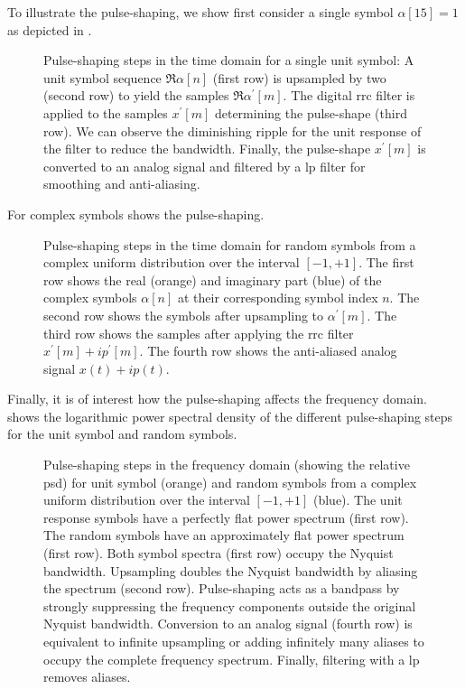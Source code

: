 To illustrate the pulse-shaping, we show first consider a single symbol $\alpha[15]=1$ as depicted in .
\begin{figure}[htb]
	\centering
	
	\caption{Pulse-shaping steps in the time domain for a single unit symbol: A unit symbol sequence $\Re\alpha[n]$ (first row) is upsampled by two (second row) to yield the samples $\Re\alpha^\prime[m]$. The digital \gls{rrc} filter is applied to the samples $x^\prime[m]$ determining the pulse-shape (third row). We can observe the diminishing ripple for the unit response of the filter to reduce the bandwidth. Finally, the pulse-shape $x^\prime[m]$ is converted to an analog signal and filtered by a \gls{lp} filter for smoothing and anti-aliasing.}\label{fig:pulse_shaping_unit_time}
\end{figure}
For complex symbols  shows the pulse-shaping.
\begin{figure}[htb]
	\centering
	
	\caption{Pulse-shaping steps in the time domain for random symbols from a complex uniform distribution over the interval $[-1,+1]$. The first row shows the real (orange) and imaginary part (blue) of the complex symbols $\alpha[n]$ at their corresponding symbol index $n$. The second row shows the symbols after upsampling to $\alpha^\prime[m]$. The third row shows the samples after applying the \gls{rrc} filter $x^\prime[m]+ip^\prime[m]$. The fourth row shows the anti-aliased analog signal $x(t)+ip(t)$.}\label{fig:pulse_shaping_rand_time}
\end{figure}
Finally, it is of interest how the pulse-shaping affects the frequency domain.
 shows the logarithmic power spectral density of the different pulse-shaping steps for the unit symbol and random symbols.
\begin{figure}[htb]
	\centering
	
	\caption{Pulse-shaping steps in the frequency domain (showing the relative \gls{psd}) for unit symbol (orange) and random symbols from a complex uniform distribution over the interval $[-1,+1]$ (blue). The unit response symbols have a perfectly flat power spectrum (first row). The random symbols have an approximately flat power spectrum (first row). Both symbol spectra (first row) occupy the Nyquist bandwidth. Upsampling doubles the Nyquist bandwidth by aliasing the spectrum (second row). Pulse-shaping acts as a bandpass by strongly suppressing the frequency components outside the original Nyquist bandwidth. Conversion to an analog signal (fourth row) is equivalent to infinite upsampling or adding infinitely many aliases to occupy the complete frequency spectrum. Finally, filtering with a \gls{lp} removes aliases.}\label{fig:pulse_shaping_freq}
\end{figure}

